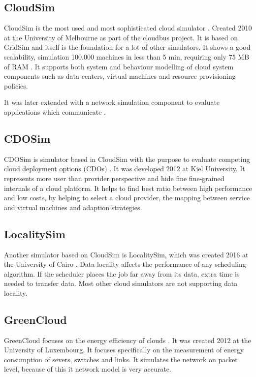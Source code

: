 \subsection{CloudSim}
CloudSim is the most used and most sophisticated cloud simulator \cite{compare_grid_cloud}. Created 2010 at the University of Melbourne as part of the cloudbus project. It is based on GridSim and itself is the foundation for a lot of other simulators. It shows a good scalability, simulation 100.000 machines in less than 5 min, requiring only 75 MB of RAM \cite{survey_clouds}. It supports both system and behaviour modelling of cloud system components such as data centers, virtual machines and resource provisioning policies.

It was later extended with a network simulation component to evaluate applications which communicate \cite{networkcloudsim}.

\subsection{CDOSim}
CDOSim is simulator based in CloudSim with the purpose to evaluate competing cloud deployment options (CDOs) \cite{cdosim}.  It was developed 2012 at Kiel University. It represents more user than provider perspective and hide fine fine-grained internals of a cloud platform. It helps to find best ratio between high performance and low costs, by helping to  select a cloud provider, the mapping between service and virtual machines and adaption strategies. 

\subsection{LocalitySim}
Another simulator based on CloudSim is LocalitySim, which was created 2016 at the University of Cairo \cite{localitysim}. Data locality affects the performance of any scheduling algorithm. If the scheduler places the job far away from its data, extra time is needed to transfer data. Most other cloud simulators are not supporting data locality.


\subsection{GreenCloud}

GreenCloud focuses on the energy efficiency of clouds \cite{green_cloud}. It was created 2012 
at the University of Luxembourg. It focuses specifically on the measurement of energy consumption of severs, switches and links. It simulates the network on packet level, because of this it network model is very accurate.  

